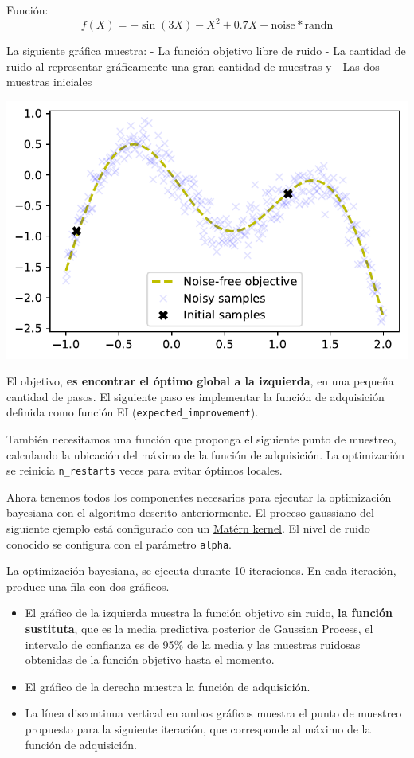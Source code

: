 \documentclass[
  12pt,
  letterpaper,
  DIV=11,
  numbers=noendperiod]{scrartcl}
\providecommand{\tightlist}{%
  \setlength{\itemsep}{0pt}\setlength{\parskip}{0pt}}\usepackage{longtable,booktabs,array}
\begin{document}
Función: \[
f(X)=-\sin(3X)-X^2+0.7X + \text{noise}*\text{randn}
\]

La siguiente gráfica muestra: - La función objetivo libre de ruido - La
cantidad de ruido al representar gráficamente una gran cantidad de
muestras y - Las dos muestras iniciales

\includegraphics{ProyFinal_OptBayesiana_2024_y_files/figure-pdf/cell-3-output-1.pdf}

El objetivo, \textbf{es encontrar el óptimo global a la izquierda}, en
una pequeña cantidad de pasos. El siguiente paso es implementar la
función de adquisición definida como función EI
(\texttt{expected\_improvement}).

También necesitamos una función que proponga el siguiente punto de
muestreo, calculando la ubicación del máximo de la función de
adquisición. La optimización se reinicia \texttt{n\_restarts} veces para
evitar óptimos locales.

Ahora tenemos todos los componentes necesarios para ejecutar la
optimización bayesiana con el algoritmo descrito anteriormente. El
proceso gaussiano del siguiente ejemplo está configurado con un
\href{http://scikit-learn.org/stable/modules/gaussian_process.html\#matern-kernel}{Matérn
kernel}. El nivel de ruido conocido se configura con el parámetro
\texttt{alpha}.

La optimización bayesiana, se ejecuta durante 10 iteraciones. En cada
iteración, produce una fila con dos gráficos.

\begin{itemize}
\tightlist
\item
  El gráfico de la izquierda muestra la función objetivo sin ruido,
  \textbf{la función sustituta}, que es la media predictiva posterior de
  Gaussian Process, el intervalo de confianza es de 95\% de la media y
  las muestras ruidosas obtenidas de la función objetivo hasta el
  momento.
\item
  El gráfico de la derecha muestra la función de adquisición.
\item
  La línea discontinua vertical en ambos gráficos muestra el punto de
  muestreo propuesto para la siguiente iteración, que corresponde al
  máximo de la función de adquisición.
\end{itemize}
\end{document}
